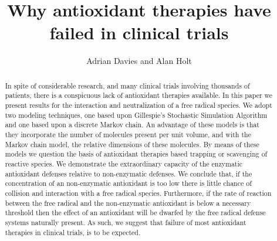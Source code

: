 \documentclass[preprint,12pt,authoryear]{elsarticle}
\begin{document}
 

\newcommand{\inquotes}[1] { ``{#1}''}

\begin{frontmatter}





\title{Why antioxidant therapies have failed in clinical trials}



\author{Adrian Davies and Alan Holt}

\address{}

\begin{abstract}

In spite of considerable research, and many clinical trials involving thousands of patients, there is a conspicuous lack of antioxidant therapies available. In this paper we present results for the interaction and neutralization of a free radical species. We adopt two modeling techniques, one based upon Gillespie’s Stochastic Simulation Algorithm and one based upon a discrete Markov chain. An advantage of these models is that they incorporate the number of molecules present per unit volume, and with the Markov chain model, the relative dimensions of these molecules. By means of these models we question the basis of antioxidant therapies based trapping or scavenging of reactive species. We demonstrate the extraordinary capacity of the enzymatic antioxidant defenses relative to non-enzymatic defenses. We conclude that, if the concentration of an non-enzymatic antioxidant is too low there is little chance of collision and interaction with a free radical species. Furthermore, if the rate of reaction between the free radical and the non-enzymatic antioxidant is below a necessary threshold then the effect of an antioxidant will be dwarfed by the free radical defense systems naturally present. As such, we suggest that failure of most antioxidant therapies in clinical trials, is to be expected.


\end{abstract}
\end{frontmatter}
\end{document}
